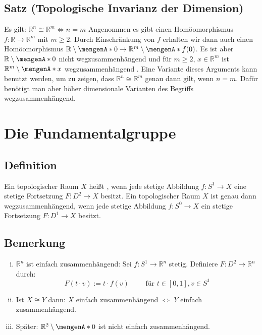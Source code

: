 \subsection{Satz (Topologische Invarianz der Dimension)} %
\label{sub:84}
Es gilt: $\mathds{R}^n \cong \mathds{R}^m \iff n=m$
Angenommen es gibt einen Homöomorphismus $f : \mathds{R} \to \mathds{R}^m$ mit $m \ge 2$. Durch Einschränkung von $f$ erhalten wir dann auch einen Homöomorphismus 
$\mathds{R} \setminus\set{0} \to \mathds{R}^m \setminus \set{f(0)}$. Es ist aber $\mathds{R} \setminus \set{0}$ nicht wegzusammenhängend und für 
$m \ge 2$, $x \in \mathds{R}^m$ ist $\mathds{R}^m \setminus \set{x}$ wegzusammenhängend \light. \bewende
{}
Eine Variante dieses Arguments kann benutzt werden, um zu zeigen, dass $\mathds{R}^n \cong \mathds{R}^m$ genau dann gilt, wenn $n=m$. Dafür benötigt man aber höher dimensionale 
Varianten des Begriffs wegzusammenhängend.
\newpage

\section{Die Fundamentalgruppe} %
\label{sec:9}

\subsection[Definition: Einfach zusammenhängender topologischer Raum]{Definition} %
\label{sub:91}
Ein topologischer Raum $X$ heißt , wenn jede stetige Abbildung $f : S^1 \to X$ eine stetige
Fortsetzung $F : D^2 \to X$ besitzt.
Ein topologischer Raum $X$ ist genau dann wegzusammenhängend, wenn jede stetige Abbildung $f : S^0 \to X$ ein stetige Fortsetzung $F : D^1 \to X$ besitzt.

\subsection[Bemerkungen zu einfach zusammenhängenden Räumen]{Bemerkung} %
\label{sub:92}
\begin{enumerate}[(i)]
	\item $\mathds{R}^n$ ist einfach zusammenhängend: Sei $f : S^1 \to \mathds{R}^n$ stetig. Definiere $F : D^2 \to \mathds{R}^n$ durch:
	\[
		F(t \cdot v) := t \cdot f(v) \qquad \text{ für } t \in [0,1], v \in S^1
	\]
	\item Ist $X \cong Y$ dann: $X$ einfach zusammenhängend $\Leftrightarrow$ $Y$ einfach zusammenhängend.
	\item Später: $\mathds{R}^2 \setminus \set{0}$ ist nicht einfach zusammenhängend.
\end{enumerate}


